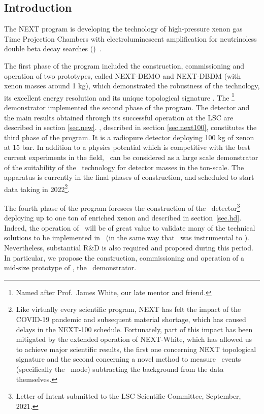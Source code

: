 \subsection{Introduction}

The NEXT program is developing the technology of high-pressure xenon gas Time Projection Chambers  with electroluminescent amplification for neutrinoless double beta decay searches (\bbonu)~\cite{Gomez-Cadenas:2019sfa}. 


The first phase of the program included the construction, commissioning and operation of two prototypes, called NEXT-DEMO and NEXT-DBDM (with xenon masses around 1 kg), which demonstrated the robustness of the technology, its excellent energy resolution and its unique topological signature \cite{Alvarez:2012xda, Alvarez:2013gxa, Alvarez:2012hh, Ferrario:2015kta}. The \NEW\footnote{Named after Prof.~James White, our late mentor and friend.} demonstrator implemented the second phase of the program. The detector and the main results obtained through its successful operation at the LSC are described in section \ref{sec.new}. \Next, described in section \ref{sec.next100}, constitutes the third phase of the program. It is a radiopure detector deploying 100 kg of xenon at 15 bar. In addition to a physics potential which is competitive with the best current experiments in the field, \Next\ can be considered as a large scale demonstrator of the suitability of the \HPXeEL\ technology for detector masses in the ton-scale. The apparatus is currently in the final phases of construction, and scheduled to start data taking in 2022\footnote{
Like virtually every scientific program, NEXT has felt the impact of the COVID-19 pandemic and subsequent material shortage, which has caused delays in the NEXT-100 schedule. Fortunately, part of this impact has been mitigated by the extended operation of NEXT-White, which has allowed us to achieve major scientific results, the first one concerning NEXT topological signature and the second concerning a novel method to measure \bb\ events
(specifically the \bbtnu\ mode) subtracting the background from the data themselves.}. 


The fourth phase of the program foresees the construction of the \NHD\ detector\footnote{Letter of Intent submitted to the LSC Scientific Committee, September,  2021.} deploying up to one ton of enriched xenon and described in section~\ref{sec.hd}. Indeed, the operation of \Next\ will be of great value to validate many of the technical solutions to be implemented in \NHD\ (in the same way that \NEW\ was instrumental to \Next). Nevertheless, substantial R\&D is also required and proposed during this period. In particular, we propose the construction, commissioning and operation of a mid-size prototype of \NHD, the \HDEMO\ demonstrator. 

